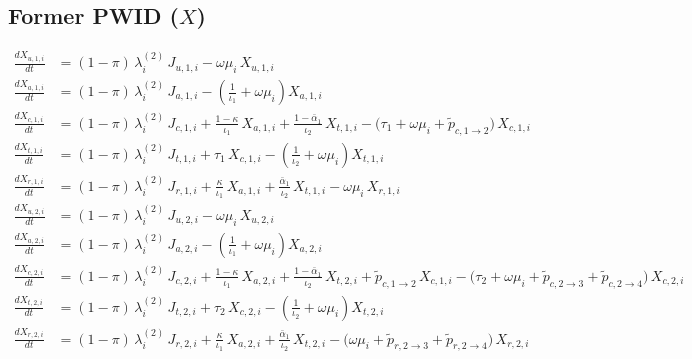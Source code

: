 \subsection{Former PWID ($X$)}

\begin{align*}
\frac{dX_{u,1,i}}{dt}
  &= (1-\pi)\,\lambda_i^{(2)}\,J_{u,1,i}
     - \omega\mu_i\,X_{u,1,i}
\\[0.8em]
\frac{dX_{a,1,i}}{dt}
  &= (1-\pi)\,\lambda_i^{(2)}\,J_{a,1,i}
     - \left(\frac{1}{\iota_1} + \omega\mu_i\right)X_{a,1,i}
\\[0.8em]
\frac{dX_{c,1,i}}{dt}
  &= (1-\pi)\,\lambda_i^{(2)}\,J_{c,1,i}
     + \frac{1-\kappa}{\iota_1}\,X_{a,1,i}
     + \frac{1-\bar{\alpha}_1}{\iota_2}\,X_{t,1,i}
     - \bigl(\tau_1 + \omega\mu_i + \tilde{p}_{c,1\to2}\bigr)\,X_{c,1,i}
\\[0.8em]
\frac{dX_{t,1,i}}{dt}
  &= (1-\pi)\,\lambda_i^{(2)}\,J_{t,1,i}
     + \tau_1\,X_{c,1,i}
     - \left(\frac{1}{\iota_2} + \omega\mu_i\right)X_{t,1,i}
\\[0.8em]
\frac{dX_{r,1,i}}{dt}
  &= (1-\pi)\,\lambda_i^{(2)}\,J_{r,1,i}
     + \frac{\kappa}{\iota_1}\,X_{a,1,i}
     + \frac{\bar{\alpha}_1}{\iota_2}\,X_{t,1,i}
     - \omega\mu_i\,X_{r,1,i}
\\[1.2em]
\frac{dX_{u,2,i}}{dt}
  &= (1-\pi)\,\lambda_i^{(2)}\,J_{u,2,i}
     - \omega\mu_i\,X_{u,2,i}
\\[0.8em]
\frac{dX_{a,2,i}}{dt}
  &= (1-\pi)\,\lambda_i^{(2)}\,J_{a,2,i}
     - \left(\frac{1}{\iota_1} + \omega\mu_i\right)X_{a,2,i}
\\[0.8em]
\frac{dX_{c,2,i}}{dt}
  &= (1-\pi)\,\lambda_i^{(2)}\,J_{c,2,i}
     + \frac{1-\kappa}{\iota_1}\,X_{a,2,i}
     + \frac{1-\bar{\alpha}_1}{\iota_2}\,X_{t,2,i}
     + \tilde{p}_{c,1\to2}\,X_{c,1,i}
     - \bigl(\tau_2 + \omega\mu_i + \tilde{p}_{c,2\to3} + \tilde{p}_{c,2\to4}\bigr)\,X_{c,2,i}
\\[0.8em]
\frac{dX_{t,2,i}}{dt}
  &= (1-\pi)\,\lambda_i^{(2)}\,J_{t,2,i}
     + \tau_2\,X_{c,2,i}
     - \left(\frac{1}{\iota_2} + \omega\mu_i\right)X_{t,2,i}
\\[0.8em]
\frac{dX_{r,2,i}}{dt}
  &= (1-\pi)\,\lambda_i^{(2)}\,J_{r,2,i}
     + \frac{\kappa}{\iota_1}\,X_{a,2,i}
     + \frac{\bar{\alpha}_1}{\iota_2}\,X_{t,2,i}
     - \bigl(\omega\mu_i + \tilde{p}_{r,2\to3}
             + \tilde{p}_{r,2\to4}\bigr)\,X_{r,2,i}
\\[1.2em]

\end{align*}
